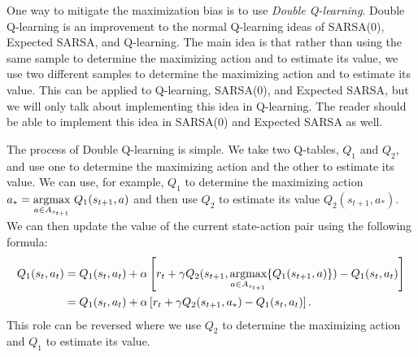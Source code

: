 One way to mitigate the maximization bias is to use \emph{Double Q-learning}.
Double Q-learning is an improvement to the normal Q-learning ideas of SARSA(0), Expected SARSA, and Q-learning.
The main idea is that rather than using the same sample to determine the maximizing action and to estimate its value, we use two different samples to determine the maximizing action and to estimate its value.
This can be applied to Q-learning, SARSA(0), and Expected SARSA, but we will only talk about implementing this idea in Q-learning.
The reader should be able to implement this idea in SARSA(0) and Expected SARSA as well.

The process of Double Q-learning is simple.
We take two Q-tables, $Q_1$ and $Q_2$, and use one to determine the maximizing action and the other to estimate its value.
We can use, for example, $Q_1$ to determine the maximizing action $a_*=\underset{a\in A_{s_{t+1}}}{\mbox{argmax}}\text{ } Q_1(s_{t+1},a)$ and then use $Q_2$ to estimate its value $Q_2(s_{t+1},a_*)$.
We can then update the value of the current state-action pair using the following formula:
\begin{align*}
    Q_1(s_t,a_t) &= Q_1(s_t,a_t) + \alpha\left[r_{t} + \gamma Q_2(s_{t+1},\underset{a\in A_{s_{t+1}}}{\mbox{argmax}} \{Q_1(s_{t+1},a)\}) - Q_1(s_t,a_t)\right] \\
                 &= Q_1(s_t,a_t) + \alpha\left[r_{t} + \gamma Q_2(s_{t+1},a_*) - Q_1(s_t,a_t)\right].
    \label{eq:double_q}
\end{align*}
This role can be reversed where we use $Q_2$ to determine the maximizing action and $Q_1$ to estimate its value.

